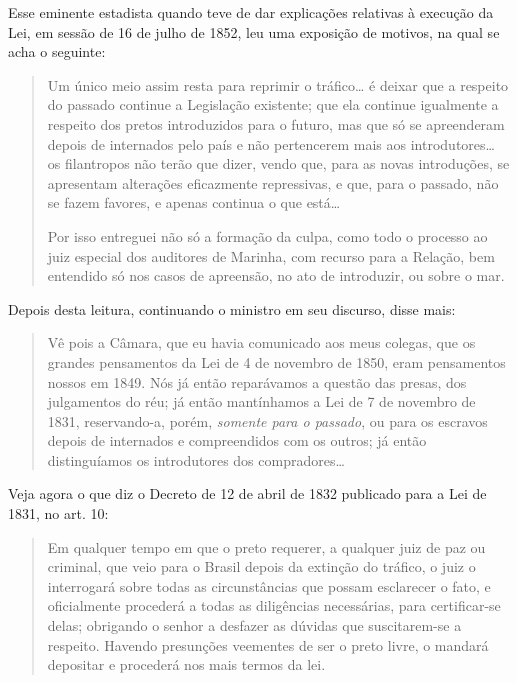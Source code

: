 Esse eminente estadista quando teve de dar explicações relativas à
execução da Lei, em sessão de 16 de julho de 1852, leu uma exposição de
motivos, na qual se acha o seguinte:

\begin{quote}
Um único meio assim resta para reprimir o tráfico\ldots{} é deixar que a
respeito do passado continue a Legislação existente; que ela continue
igualmente a respeito dos pretos introduzidos para o futuro, mas que só
se apreenderam depois de internados pelo 
país  
e não pertencerem mais aos introdutores\ldots{} os filantropos não
terão que dizer, vendo que, para as
novas introduções, se
apresentam alterações eficazmente repressivas, e
que, para o passado, não se fazem favores, e apenas continua o que
está\ldots{}

Por isso entreguei não só a formação da culpa, como todo o processo ao
juiz especial dos auditores de Marinha, com recurso para a Relação, bem
entendido só nos casos de apreensão, no ato de introduzir, ou sobre o
mar.
\end{quote}

Depois desta leitura, continuando o ministro em seu discurso, disse mais:

\begin{quote}
Vê pois a Câmara, que eu havia comunicado aos meus colegas, que os
grandes pensamentos da Lei de 4 de novembro de 1850, eram pensamentos
nossos em 1849. Nós já então reparávamos a questão das presas, dos
julgamentos do réu; já então mantínhamos a Lei de 7 de novembro de 1831,
reservando-a, porém, \emph{somente para o passado}, ou para os escravos
depois de internados e compreendidos com os outros; já então
distinguíamos os introdutores dos compradores\ldots{}
\end{quote}

Veja agora o que diz o Decreto de 12 de abril de 1832 publicado para a
Lei de 1831, no art. 10:

\begin{quote}
Em qualquer tempo em que o preto requerer, a qualquer juiz de paz ou
criminal, que veio para o Brasil depois da extinção do tráfico, o juiz o
interrogará sobre todas as circunstâncias que possam esclarecer o fato,
e oficialmente procederá a todas as diligências necessárias, para
certificar-se delas; obrigando o senhor a desfazer as dúvidas que
suscitarem-se a respeito. Havendo presunções veementes de ser o preto
livre, o mandará depositar e procederá nos mais termos da lei.
\end{quote}

